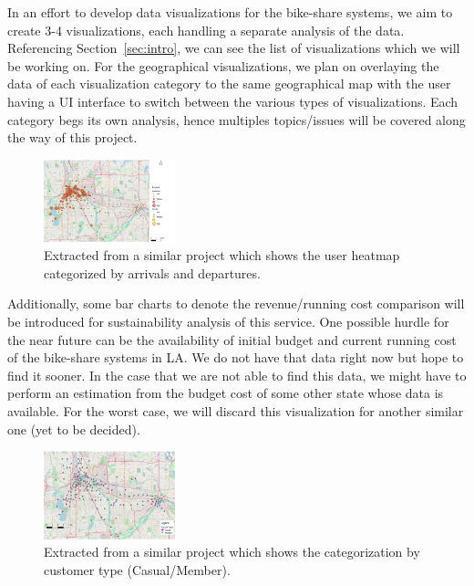 In an effort to develop data visualizations for the bike-share systems, we aim to create 3-4 visualizations, each handling a separate analysis of the data. Referencing Section~\ref{sec:intro}, we can see the list of visualizations which we will be working on. For the geographical visualizations, we plan on overlaying the data of each visualization category to the same geographical map with the user having a UI interface to switch between the various types of visualizations. Each category begs its own analysis, hence multiples topics/issues will be covered along the way of this project.
\begin{figure}[h]
	\centering %
	\includegraphics[width=1.5in]{figs/Heat}
	\caption{Extracted from a similar project which shows the user heatmap categorized by arrivals and departures.}
	\label{fig:Heat Map}
\end{figure}
Additionally, some bar charts to denote the revenue/running cost comparison will be introduced for sustainability analysis of this service. One possible hurdle for the near future can be the availability of initial budget and current running cost of the bike-share systems in LA. We do not have that data right now but hope to find it sooner. In the case that we are not able to find this data, we might have to perform an estimation from the budget cost of some other state whose data is available. For the worst case, we will discard this visualization for another similar one (yet to be decided).
\begin{figure}[h]
 \centering %
 \includegraphics[width=1.5in]{figs/UserType}
 \caption{Extracted from a similar project which shows the categorization by customer type (Casual/Member).}
 \label{fig:Customer Type}
\end{figure}

